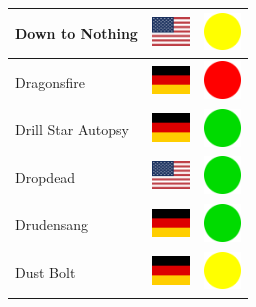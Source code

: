 \documentclass[12pt, a4paper, twoside]{report}
\begin{document}
\begin{center}
\begin{longtable}{|p{5cm}|p{2cm}|p{2cm}|}
 Down to Nothing                                            & \includegraphics[width=1cm]{../img/flags/us} &   \includegraphics[width=1cm]{../likes/m} \\ \hline
 Dragonsfire                                                & \includegraphics[width=1cm]{../img/flags/de} &   \includegraphics[width=1cm]{../likes/n} \\ \hline
 Drill Star Autopsy                                         & \includegraphics[width=1cm]{../img/flags/de} &   \includegraphics[width=1cm]{../likes/y} \\ \hline
 Dropdead                                                   & \includegraphics[width=1cm]{../img/flags/us} &   \includegraphics[width=1cm]{../likes/y} \\ \hline
 Drudensang                                                 & \includegraphics[width=1cm]{../img/flags/de} &   \includegraphics[width=1cm]{../likes/y} \\ \hline
 Dust Bolt                                                  & \includegraphics[width=1cm]{../img/flags/de} &   \includegraphics[width=1cm]{../likes/m} \\ \hline

\end{longtable}
\end{center}
\end{document}
